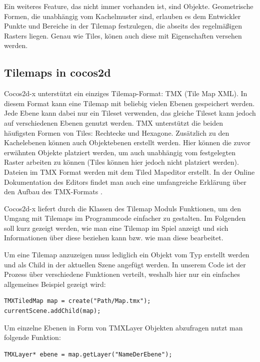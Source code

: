 Ein weiteres Feature, das nicht immer vorhanden ist, sind Objekte. Geometrische Formen, die unabhängig vom Kachelmuster sind, erlauben es dem Entwickler Punkte und Bereiche in der Tilemap festzulegen, die abseits des regelmäßigen Rasters liegen. Genau wie Tiles, könen auch diese mit Eigenschaften versehen werden.

\subsection{Tilemaps in cocos2d}
Cocos2d-x unterstützt ein einziges Tilemap-Format: TMX (Tile Map XML). In diesem Format kann eine Tilemap mit beliebig vielen Ebenen gespeichert werden. Jede Ebene kann dabei nur ein Tileset verwenden, das gleiche Tileset kann jedoch auf verschiedenen Ebenen genutzt werden. TMX unterstützt die beiden häufigsten Formen von Tiles: Rechtecke und Hexagone. 
Zusätzlich zu den Kachelebenen können auch Objektebenen erstellt werden. Hier können die zuvor erwähnten Objekte platziert werden, um auch unabhängig vom festgelegten Raster arbeiten zu können (Tiles können hier jedoch nicht platziert werden).
Dateien im TMX Format werden mit dem Tiled Mapeditor erstellt. In der Online Dokumentation des Editors findet man auch eine umfangreiche Erklärung über den Aufbau des TMX-Formats \cite{TiledDocFormat}.

Cocos2d-x liefert durch die Klassen des Tilemap Moduls Funktionen, um den Umgang mit Tilemaps im Programmcode einfacher zu gestalten. Im Folgenden soll kurz gezeigt werden, wie man eine Tilemap im Spiel anzeigt und sich Informationen über diese beziehen kann bzw. wie man diese bearbeitet.

Um eine Tilemap anzuzeigen muss lediglich ein Objekt vom Typ  erstellt werden und als Child in der aktuellen Szene angefügt werden. In unserem Code ist der Prozess über verschiedene Funktionen verteilt, weshalb hier nur ein einfaches allgemeines Beispiel gezeigt wird:

\begin{lstlisting}[style=singleline]
TMXTiledMap map = create("Path/Map.tmx");
currentScene.addChild(map);
\end{lstlisting}

Um einzelne Ebenen in Form von TMXLayer Objekten abzufragen nutzt man folgende Funktion:

\begin{lstlisting}[style=singleline]
TMXLayer* ebene = map.getLayer("NameDerEbene");
\end{lstlisting}

